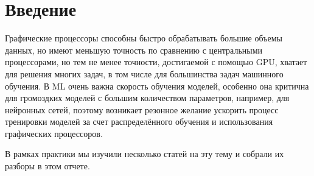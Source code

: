 
\section{Введение}


Графические процессоры способны быстро обрабатывать большие объемы данных, но имеют меньшую точность по сравнению с центральными процессорами, но тем не менее точности, достигаемой с помощью GPU, хватает для решения многих задач, в том числе для большинства задач машинного обучения. В ML очень важна скорость обучения моделей, особенно она критична для громоздких моделей с большим количеством параметров, например, для нейронных сетей, поэтому возникает резонное желание ускорить процесс тренировки моделей за счет распределённого обучения и использования графических процессоров. 

В рамках практики мы изучили несколько статей на эту тему и собрали их разборы в этом отчете.
